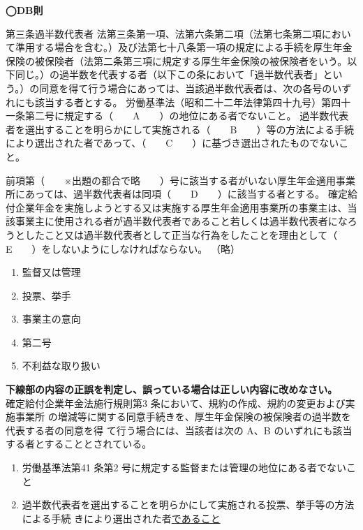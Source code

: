 \begin{fillblank}[自作 2026/10/4]

  \noindent \textbf{◯DB則}
  \begin{lawstructure}
    \begin{lawarticle}{第三条}{過半数代表者}
      法第三条第一項、法第六条第二項（法第七条第二項において準用する場合を含む。）及び法第七十八条第一項の規定による手続を厚生年金保険の被保険者（法第二条第三項に規定する厚生年金保険の被保険者をいう。以下同じ。）の過半数を代表する者（以下この条において「過半数代表者」という。）の同意を得て行う場合にあっては、当該過半数代表者は、次の各号のいずれにも該当する者とする。
      労働基準法（昭和二十二年法律第四十九号）第四十一条第二号に規定する（　　A　　）の地位にある者でないこと。
      過半数代表者を選出することを明らかにして実施される（　　B　　）等の方法による手続により選出された者であって、（　　C　　）に基づき選出されたものでないこと。
      
      前項第（　　※出題の都合で略　　）号に該当する者がいない厚生年金適用事業所にあっては、過半数代表者は同項（　　D　　）に該当する者とする。
      確定給付企業年金を実施しようとする又は実施する厚生年金適用事業所の事業主は、当該事業主に使用される者が過半数代表者であること若しくは過半数代表者になろうとしたこと又は過半数代表者として正当な行為をしたことを理由として（　　E　　）をしないようにしなければならない。
       （略）
    \end{lawarticle}
  \end{lawstructure}

\end{fillblank}

\begin{answerbox}
 \begin{enumerate}[A:]
    \item 監督又は管理
    \item 投票、挙手
    \item 事業主の意向
    \item 第二号
    \item 不利益な取り扱い
  \end{enumerate}
\end{answerbox}



\begin{truefalse}[年金1 \ 2019 \ 問題1(2)\textcircled{6}]
\textbf{下線部の内容の正誤を判定し、誤っている場合は正しい内容に改めなさい。}
\\

確定給付企業年金法施行規則第3 条において、規約の作成、規約の変更および実施事業所
の増減等に関する同意手続きを、厚生年金保険の被保険者の過半数を代表する者の同意を得
て行う場合には、当該者は次の A、B のいずれにも該当する者とすることとされている。
\begin{enumerate}[A]
  \item 労働基準法第41 条第2 号に規定する監督または管理の地位にある者でないこと
  \item 過半数代表者を選出することを明らかにして実施される投票、挙手等の方法による手続
きにより選出された者\underline{であること}
\end{enumerate}
\end{truefalse}

